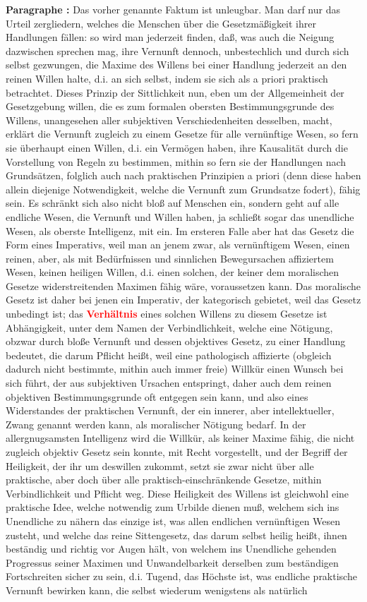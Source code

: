 \documentclass[a4paper,12pt,twoside]{book}
\newcommand{\match}[1]{\textcolor{red}{\textbf{#1}}}
\begin{document}
	\noindent\textbf{Paragraphe : }Das vorher genannte Faktum ist unleugbar. Man darf nur das Urteil zergliedern, welches die Menschen über die Gesetzmäßigkeit ihrer Handlungen fällen: so wird man jederzeit finden, daß, was auch die Neigung dazwischen sprechen mag, ihre Vernunft dennoch, unbestechlich und durch sich selbst gezwungen, die Maxime des Willens bei einer Handlung jederzeit an den reinen Willen halte, d.i. an sich selbst, indem sie sich als a priori praktisch betrachtet. Dieses Prinzip der Sittlichkeit nun, eben um der Allgemeinheit der Gesetzgebung willen, die es zum formalen obersten Bestimmungsgrunde des Willens, unangesehen aller subjektiven Verschiedenheiten desselben, macht, erklärt die Vernunft zugleich zu einem Gesetze für alle vernünftige Wesen, so fern sie überhaupt einen Willen, d.i. ein Vermögen haben, ihre Kausalität durch die Vorstellung von Regeln zu bestimmen, mithin so fern sie der Handlungen nach Grundsätzen, folglich auch nach praktischen Prinzipien a priori (denn diese haben allein diejenige Notwendigkeit, welche die Vernunft zum Grundsatze fodert), fähig sein. Es  schränkt sich also nicht bloß auf Menschen ein, sondern geht auf alle endliche Wesen, die Vernunft und Willen haben, ja schließt sogar das unendliche Wesen, als oberste Intelligenz, mit ein. Im ersteren Falle aber hat das Gesetz die Form eines Imperativs, weil man an jenem zwar, als vernünftigem Wesen, einen reinen, aber, als mit Bedürfnissen und sinnlichen Bewegursachen affiziertem Wesen, keinen heiligen Willen, d.i. einen solchen, der keiner dem moralischen Gesetze widerstreitenden Maximen fähig wäre, voraussetzen kann. Das moralische Gesetz ist daher bei jenen ein Imperativ, der kategorisch gebietet, weil das Gesetz unbedingt ist; das \match{Verhältnis} eines solchen Willens zu diesem Gesetze ist Abhängigkeit, unter dem Namen der Verbindlichkeit, welche eine Nötigung, obzwar durch bloße Vernunft und dessen objektives Gesetz, zu einer Handlung bedeutet, die darum Pflicht heißt, weil eine pathologisch affizierte (obgleich dadurch nicht bestimmte, mithin auch immer freie) Willkür einen Wunsch bei sich führt, der aus subjektiven Ursachen entspringt, daher auch dem reinen objektiven Bestimmungsgrunde oft entgegen sein kann, und also eines Widerstandes der praktischen Vernunft, der ein innerer, aber intellektueller, Zwang genannt werden kann, als moralischer Nötigung bedarf. In der allergnugsamsten Intelligenz wird die Willkür, als keiner Maxime fähig, die nicht zugleich objektiv Gesetz sein konnte, mit Recht vorgestellt, und der Begriff der Heiligkeit, der ihr um deswillen zukommt, setzt sie zwar nicht über alle praktische, aber doch über alle praktisch-einschränkende Gesetze, mithin Verbindlichkeit und Pflicht weg. Diese Heiligkeit des Willens ist gleichwohl eine praktische Idee, welche notwendig zum Urbilde dienen muß, welchem sich ins Unendliche zu nähern das einzige ist, was allen endlichen vernünftigen Wesen zusteht, und welche das reine Sittengesetz, das darum selbst heilig heißt, ihnen beständig und richtig vor Augen hält, von welchem ins Unendliche gehenden Progressus seiner Maximen und Unwandelbarkeit derselben zum beständigen Fortschreiten sicher zu sein, d.i. Tugend, das  Höchste ist, was endliche praktische Vernunft bewirken kann, die selbst wiederum wenigstens als natürlich 
\end{document}
